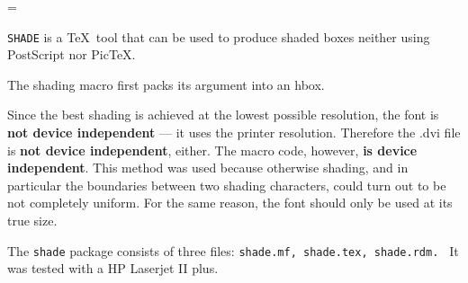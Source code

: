 
\magnification=
\parindent0pt \parskip 3pt


{\tt SHADE} is a \TeX\ tool that can be used to produce shaded boxes
neither using PostScript nor Pic\TeX.



The shading macro first packs its argument into an hbox.


Since the best shading is achieved at the lowest possible resolution,
the font  is {\bf not device independent} --- it uses
the printer resolution. Therefore the .dvi file is
{\bf not device independent}, either.
The macro code, however, {\bf is device independent}.
This method was used because otherwise shading, and in particular
the boundaries between two shading characters, could turn out to be not
completely uniform.
For the same reason, the font should only be used at its true size.

The {\tt shade} package consists of three files:
    {\tt shade.mf,           %
         shade.tex,          %
         shade.rdm.          %
       }
It was tested with a HP Laserjet II plus.

\bye
